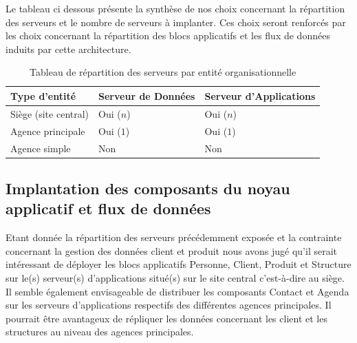 Le tableau ci dessous présente la synthèse de nos choix concernant la répartition des serveurs et le nombre de serveurs à implanter. Ces choix seront renforcés par les choix concernant la répartition des blocs applicatifs et les flux de données induits par cette architecture. 


\begin{table}[H]
    \centering
    \begin{tabular}{l|l|l}
    Type d'entité        & Serveur de Données & Serveur d'Applications \\ \hline
    Siège (site central) & Oui ($n$)            & Oui ($n$)                \\
    Agence principale    & Oui ($1$)            & Oui ($1$)                \\
    Agence simple        & Non                & Non                    \\
    \end{tabular}
    \caption{Tableau de répartition des serveurs par entité organisationnelle}
\end{table}

\subsection{Implantation des composants du noyau applicatif et flux de données}

Etant donnée la répartition des serveurs précédemment exposée et la contrainte concernant la gestion des données client et produit nous avons jugé qu'il serait intéressant de déployer les blocs applicatifs Personne, Client, Produit et Structure sur le(s) serveur(s) d'applications situé(s) sur le site central c'est-à-dire au siège. Il semble également envisageable de distribuer les composants Contact et Agenda sur les serveurs d'applications respectifs des différentes agences principales. Il pourrait être avantageux de répliquer les données concernant les client et les structures au niveau des agences principales. \\

